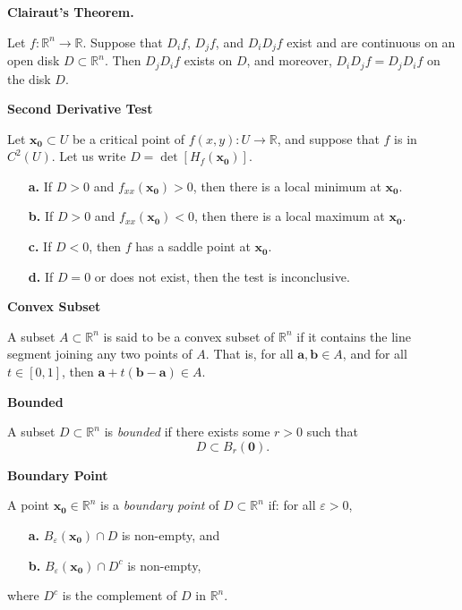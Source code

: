 \documentclass{article}
\newcommand{\R}{\mathbb{R}}
\begin{document}
\vspace{0.5cm}

\noindent \textbf{Clairaut's Theorem.} 

Let \( f : \mathbb{R}^n \rightarrow \mathbb{R} \). Suppose that \( D_i f \), \( D_j f \), and \( D_i D_j f \) exist and are continuous on an open disk \( D \subset \mathbb{R}^n \). Then \( D_j D_i f \) exists on \( D \), and moreover, \( D_i D_j f = D_j D_i f \) on the disk \( D \).


\vspace{0.5cm}

\noindent \textbf{Second Derivative Test}

Let \( \bm{x_0} \subset U \) be a critical point of \( f(x, y) : U \rightarrow \mathbb{R} \), and suppose that \( f \) is in \( C^2(U) \). Let us write \( D = \det[H_f (\bm{x_0})] \). 
\begin{enumerate}
    \item[\textbf{a.}] If \( D > 0 \) and \( f_{xx}(\bm{x_0}) > 0 \), then there is a local minimum at \( \bm{x_0} \).
    \item[\textbf{b.}] If \( D > 0 \) and \( f_{xx}(\bm{x_0}) < 0 \), then there is a local maximum at \( \bm{x_0} \).
    \item[\textbf{c.}] If \( D < 0 \), then \( f \) has a saddle point at \( \bm{x_0} \).
    \item[\textbf{d.}] If \( D = 0 \) or does not exist, then the test is inconclusive.
\end{enumerate}

\vspace{0.5cm}

\noindent \textbf{Convex Subset}

A subset \(A \subset \R^n\) is said to be a convex subset of \(\R^n\) if it contains the line segment joining any two points of \(A\). That is, for all \(\bm{a}, \bm{b} \in A\), and for all \(t \in [0, 1]\), then \(\bm{a} + t(\bm{b} - \bm{a}) \in A\).


\vspace{0.5cm}


\noindent \textbf{Bounded}

A subset \( D \subset \mathbb{R}^n \) is \textit{bounded} if there exists some \( r > 0 \) such that
\[ D \subset B_r(\bm{0}). \]

\vspace{0.5cm}

\noindent \textbf{Boundary Point}

A point \( \bm{x_0} \in \mathbb{R}^n \) is a \textit{boundary point} of \( D \subset \mathbb{R}^n \) if: for all \( \varepsilon > 0 \),
\begin{enumerate}
    \item[\textbf{a.}] \( B_{\varepsilon}(\bm{x_0}) \cap D \) is non-empty, and
    \item[\textbf{b.}] \( B_{\varepsilon}(\bm{x_0}) \cap D^c \) is non-empty,
\end{enumerate}
where \( D^c \) is the complement of \( D \) in \( \mathbb{R}^n \).
\end{document}
